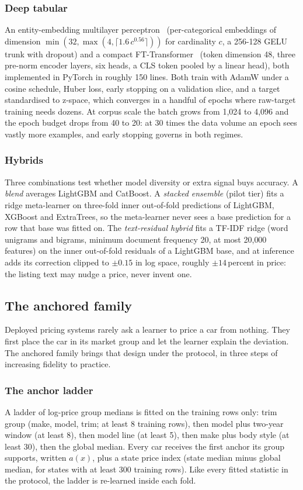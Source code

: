 \documentclass[journal,10pt]{IEEEtran}
\begin{document}
\subsubsection{Deep tabular} An entity-embedding multilayer perceptron~\cite{guo2016} (per-categorical embeddings of dimension $\min(32,\max(4,\lceil 1.6\,c^{0.56}\rceil))$ for cardinality $c$, a 256-128 GELU trunk with dropout) and a compact FT-Transformer~\cite{gorishniy2021} (token dimension 48, three pre-norm encoder layers, six heads, a CLS token pooled by a linear head), both implemented in PyTorch in roughly 150 lines. Both train with AdamW under a cosine schedule, Huber loss, early stopping on a validation slice, and a target standardised to z-space, which converges in a handful of epochs where raw-target training needs dozens. At corpus scale the batch grows from 1{,}024 to 4{,}096 and the epoch budget drops from 40 to 20: at 30 times the data volume an epoch sees vastly more examples, and early stopping governs in both regimes.

\subsubsection{Hybrids} Three combinations test whether model diversity or extra signal buys accuracy. A \emph{blend} averages LightGBM and CatBoost. A \emph{stacked ensemble} (pilot tier) fits a ridge meta-learner on three-fold inner out-of-fold predictions of LightGBM, XGBoost and ExtraTrees, so the meta-learner never sees a base prediction for a row that base was fitted on. The \emph{text-residual hybrid} fits a TF-IDF ridge (word unigrams and bigrams, minimum document frequency 20, at most 20{,}000 features) on the inner out-of-fold residuals of a LightGBM base, and at inference adds its correction clipped to $\pm 0.15$ in log space, roughly $\pm 14$\,percent in price: the listing text may nudge a price, never invent one.

\subsection{The anchored family}
\label{sec:anchored}
Deployed pricing systems rarely ask a learner to price a car from nothing. They first place the car in its market group and let the learner explain the deviation. The anchored family brings that design under the protocol, in three steps of increasing fidelity to practice.

\subsubsection{The anchor ladder} A ladder of log-price group medians is fitted on the training rows only: trim group (make, model, trim; at least 8 training rows), then model plus two-year window (at least 8), then model line (at least 5), then make plus body style (at least 30), then the global median. Every car receives the first anchor its group supports, written $a(x)$, plus a state price index (state median minus global median, for states with at least 300 training rows). Like every fitted statistic in the protocol, the ladder is re-learned inside each fold.
\end{document}
